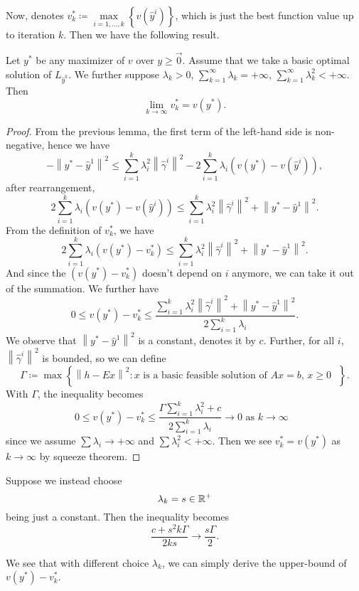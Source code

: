 Now, denotes \(v^{*}_{k}\coloneqq \max\limits_{i = 1, \ldots , k}\left\{v(\hat{y}^i)\right\}\), which is just the best function value
up to iteration \(k\). Then we have the following result.
\begin{theorem}
	Let \(y^{*}\) be any maximizer of \(v\) over \(y\geq \vec{0}\). Assume that we take a basic optimal solution of \(L_{\hat{y}^k}\). We
	further suppose \(\lambda_{k}>0\), \(\sum\limits_{k=1}^{\infty} \lambda_{k} = +\infty \), \(\sum\limits_{k=1}^{\infty} \lambda_{k}^2< +\infty\).
	Then
	\[
		\lim_{k \to \infty} v^{*}_k = v(y^{*}).
	\]
\end{theorem}
\begin{proof}
	From the previous lemma, the first term of the left-hand side is non-negative, hence we have
	\[
		- \left\lVert y^{*} - \hat{y}^1\right\rVert^2 \leq \sum\limits_{i=1}^{k} \lambda_{i}^{2}\left\lVert \hat{\gamma}^i\right\rVert^2 - 2 \sum\limits_{i=1}^{k} \lambda_{i}\left(v(y^{*}) - v(\hat{y}^i)\right),
	\]
	after rearrangement,
	\[
		2 \sum\limits_{i=1}^{k} \lambda_{i}\left(v(y^{*}) - v(\hat{y}^i)\right)\leq \sum\limits_{i=1}^{k} \lambda_{i}^{2}\left\lVert \hat{\gamma}^i\right\rVert^2 + \left\lVert y^{*} - \hat{y}^1\right\rVert^2.
	\]
	From the definition of \(v^{*}_{k}\), we have
	\[
		2 \sum\limits_{i=1}^{k} \lambda_{i}\left(v(y^{*}) - v^{*}_{k}\right)\leq \sum\limits_{i=1}^{k} \lambda_{i}^{2}\left\lVert \hat{\gamma}^i\right\rVert^2 + \left\lVert y^{*} - \hat{y}^1\right\rVert^2.
	\]
	And since the \(\left(v(y^{*}) - v^{*}_{k}\right)\) doesn't depend on \(i\) anymore, we can take it out of the summation. We further have
	\[
		0\leq v(y^{*}) - v^{*}_{k}\leq \frac{\sum\limits_{i=1}^{k} \lambda_{i}^{2}\left\lVert \hat{\gamma}^i\right\rVert^2 + \left\lVert y^{*} - \hat{y}^1\right\rVert^2}{2 \sum\limits_{i=1}^{k} \lambda_{i}}.
	\]
	We observe that \(\left\lVert y^{*} - \hat{y}^1\right\rVert^2 \) is a constant, denotes it by \(c\). Further, for all \(i\), \(\left\lVert \hat{\gamma}^i\right\rVert^2 \) is bounded, so we can define
	\[
		\Gamma\coloneqq \max\left\{\left\lVert h - Ex\right\rVert^2\colon \text{\(x\) is a basic feasible solution of \(Ax = b\), \(x\geq 0\)  }\right\}.
	\]
	With \(\Gamma\), the inequality becomes
	\[
		0\leq v(y^{*}) - v^{*}_{k}\leq \frac{\Gamma\sum\limits_{i=1}^{k} \lambda_{i}^{2} + c}{2 \sum\limits_{i=1}^{k} \lambda_{i}}\to 0 \text{ as \(k \to  \infty \) }
	\]
	since we assume \(\sum \lambda_{i} \to  +\infty \) and \(\sum\limits\lambda_{i}^{2}< +\infty  \). Then we see \(v^{*}_{k} = v(y^{*})\) as \(k \to \infty \) by squeeze theorem.
\end{proof}
\begin{remark}
	Suppose we instead choose
	\[
		\lambda_{k} = s\in\mathbb{\MakeUppercase{R}}^+
	\]
	being just a constant. Then the inequality becomes
	\[
		\frac{c + s^2 k \Gamma }{2 k s}\to \frac{s \Gamma}{2}.
	\]

	We see that with different choice \(\lambda_{k}\), we can simply derive the upper-bound of \(v(y^{*}) - v^{*}_{k}\).
\end{remark}

